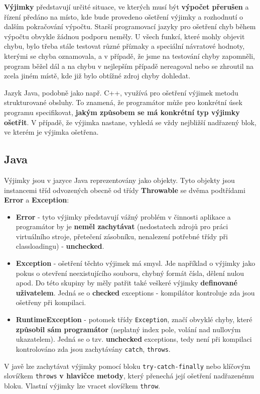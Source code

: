 \textbf{Výjimky} představují určité situace, ve kterých musí být \textbf{výpočet přerušen} a řízení předáno na místo, kde bude provedeno ošetření výjimky a rozhodnutí o dalším pokračování výpočtu. Starší programovací jazyky pro ošetření chyb během výpočtu obvykle žádnou podporu neměly. U všech funkcí, které mohly objevit chybu, bylo třeba stále testovat různé příznaky a speciální návratové hodnoty, kterými se chyba oznamovala, a v případě, že jsme na testování chyby zapomněli, program běžel dál a na chybu v nejlepším případě nereagoval nebo se zhroutil na zcela jiném místě, kde již bylo obtížné zdroj chyby dohledat. 

Jazyk Java, podobně jako např. C++, využívá pro ošetření výjimek metodu strukturované obsluhy. To znamená, že programátor může pro konkrétní úsek programu specifikovat, \textbf{jakým způsobem se má konkrétní typ výjimky ošetřit}. V případě, že výjimka nastane, vyhledá se vždy nejbližší nadřazený blok, ve kterém je výjimka ošetřena.

\subsection{Java}
Výjimky jsou v jazyce Java reprezentovány jako objekty. Tyto objekty jsou instancemi tříd odvozených obecně od třídy \textbf{Throwable} se dvěma podtřídami \textbf{Error} a \textbf{Exception}:
\begin{itemize}
\item \textbf{Error} - tyto výjimky představují vážný problém v činnosti aplikace a programátor by je \textbf{neměl zachytávat} (nedostatech zdrojů pro práci virtuálního stroje, přetečení zásobníku, nenalezení potřebné třídy při classloadingu) - \textbf{unchecked}.
\item \textbf{Exception} - ošetření těchto výjimek má smysl. Jde například o výjimky jako pokus o otevření neexistujícího souboru, chybný formát čísla, dělení nulou apod. Do této skupiny by měly patřit také veškeré výjimky \textbf{definované uživatelem}. Jedná se o \textbf{checked} exceptions - kompilátor kontroluje zda jsou ošetřeny při kompilaci.
\item \textbf{RuntimeException} - potomek třídy \texttt{Exception}, značí obvyklé chyby, které \textbf{způsobil sám programátor} (neplatný index pole, volání nad nullovým ukazatelem). Jedná se o tzv. \textbf{unchecked} exceptions, tedy není při kompilaci kontrolováno zda jsou zachytávány \texttt{catch}, \texttt{throws}.
\end{itemize}
V javě lze zachytávat výjimky pomocí bloku \texttt{try-catch-finally} nebo klíčovým slovíčkem \texttt{throws} \textbf{v hlavičce metody}, který přenechá její ošetření nadřazenému bloku. Vlastní výjimky lze vracet slovíčkem \texttt{throw}.

